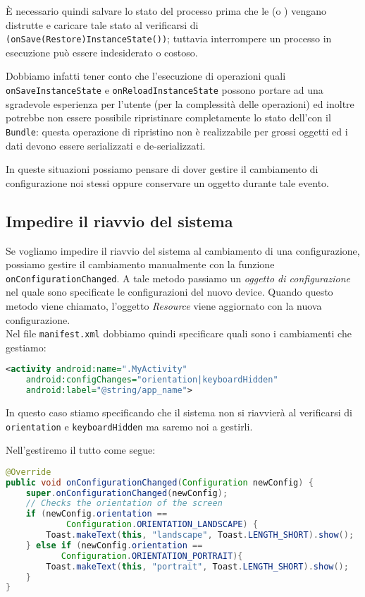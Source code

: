È necessario quindi salvare lo stato del processo prima che le \Activity (o \Fragment) vengano distrutte e caricare tale stato al verificarsi di
\texttt{(onSave(Restore)InstanceState())}; tuttavia interrompere un processo in
esecuzione può essere indesiderato o costoso.

Dobbiamo infatti tener conto che l'esecuzione di operazioni quali
\texttt{onSaveInstanceState} e \texttt{onReloadInstanceState} possono portare ad
una sgradevole esperienza per l'utente (per la complessità delle operazioni) ed
inoltre potrebbe non essere possibile ripristinare completamente lo stato
dell'\Activity con il \texttt{Bundle}: questa operazione di ripristino non è
realizzabile per grossi oggetti ed i dati devono essere serializzati e
de-serializzati.

In queste situazioni possiamo pensare di dover gestire il cambiamento di
configurazione noi stessi oppure conservare un oggetto durante tale evento.

\subsection{Impedire il riavvio del sistema}

Se vogliamo impedire il riavvio del sistema al cambiamento di una configurazione, possiamo gestire il cambiamento manualmente con la funzione \texttt{onConfigurationChanged}. 
A tale metodo passiamo un \textit{oggetto di configurazione} nel quale sono specificate le configurazioni del nuovo device.
Quando questo metodo viene chiamato, l'oggetto \textit{Resource} viene aggiornato con la
nuova configurazione.\\
Nel file \texttt{manifest.xml} dobbiamo quindi specificare quali sono i
cambiamenti che gestiamo:

\begin{lstlisting}[language=XML]
<activity android:name=".MyActivity"
	android:configChanges="orientation|keyboardHidden"
	android:label="@string/app_name">
\end{lstlisting}

In questo caso stiamo specificando che il sistema non si riavvierà al
verificarsi di \texttt{orientation} e \texttt{keyboardHidden} ma saremo noi a
gestirli.

Nell'\Activity gestiremo il tutto come segue:

\begin{lstlisting}[language=Java]
@Override
public void onConfigurationChanged(Configuration newConfig) {
	super.onConfigurationChanged(newConfig);
	// Checks the orientation of the screen
	if (newConfig.orientation ==
		    Configuration.ORIENTATION_LANDSCAPE) {
		Toast.makeText(this, "landscape", Toast.LENGTH_SHORT).show();
	} else if (newConfig.orientation ==
		   Configuration.ORIENTATION_PORTRAIT){
		Toast.makeText(this, "portrait", Toast.LENGTH_SHORT).show();
	}
}
\end{lstlisting}

